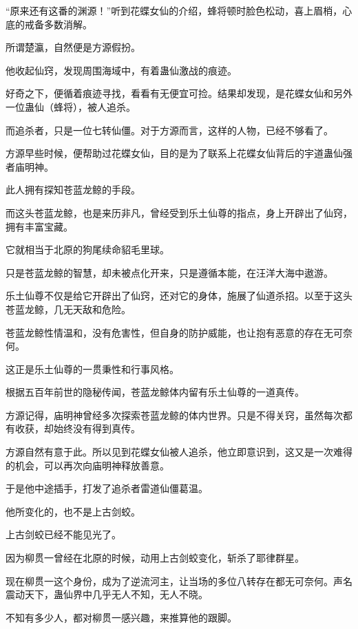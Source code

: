 
\begin{this_body}

“原来还有这番的渊源！”听到花蝶女仙的介绍，蜂将顿时脸色松动，喜上眉梢，心底的戒备多数消解。

所谓楚瀛，自然便是方源假扮。

他收起仙窍，发现周围海域中，有着蛊仙激战的痕迹。

好奇之下，便循着痕迹寻找，看看有无便宜可捡。结果却发现，是花蝶女仙和另外一位蛊仙（蜂将），被人追杀。

而追杀者，只是一位七转仙僵。对于方源而言，这样的人物，已经不够看了。

方源早些时候，便帮助过花蝶女仙，目的是为了联系上花蝶女仙背后的宇道蛊仙强者庙明神。

此人拥有探知苍蓝龙鲸的手段。

而这头苍蓝龙鲸，也是来历非凡，曾经受到乐土仙尊的指点，身上开辟出了仙窍，拥有丰富宝藏。

它就相当于北原的狗尾续命貂毛里球。

只是苍蓝龙鲸的智慧，却未被点化开来，只是遵循本能，在汪洋大海中遨游。

乐土仙尊不仅是给它开辟出了仙窍，还对它的身体，施展了仙道杀招。以至于这头苍蓝龙鲸，几无天敌和危险。

苍蓝龙鲸性情温和，没有危害性，但自身的防护威能，也让抱有恶意的存在无可奈何。

这正是乐土仙尊的一贯秉性和行事风格。

根据五百年前世的隐秘传闻，苍蓝龙鲸体内留有乐土仙尊的一道真传。

方源记得，庙明神曾经多次探索苍蓝龙鲸的体内世界。只是不得关窍，虽然每次都有收获，却始终没有得到真传。

方源自然有意于此。所以见到花蝶女仙被人追杀，他立即意识到，这又是一次难得的机会，可以再次向庙明神释放善意。

于是他中途插手，打发了追杀者雷道仙僵葛温。

他所变化的，也不是上古剑蛟。

上古剑蛟已经不能见光了。

因为柳贯一曾经在北原的时候，动用上古剑蛟变化，斩杀了耶律群星。

现在柳贯一这个身份，成为了逆流河主，让当场的多位八转存在都无可奈何。声名震动天下，蛊仙界中几乎无人不知，无人不晓。

不知有多少人，都对柳贯一感兴趣，来推算他的跟脚。


\end{this_body}
